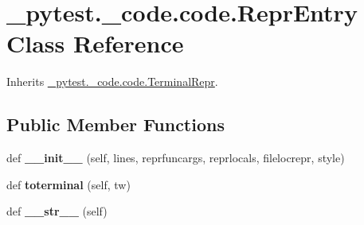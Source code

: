 \hypertarget{class__pytest_1_1__code_1_1code_1_1_repr_entry}{}\section{\+\_\+pytest.\+\_\+code.\+code.\+Repr\+Entry Class Reference}
\label{class__pytest_1_1__code_1_1code_1_1_repr_entry}


Inherits \hyperlink{class__pytest_1_1__code_1_1code_1_1_terminal_repr}{\+\_\+pytest.\+\_\+code.\+code.\+Terminal\+Repr}.

\subsection*{Public Member Functions}
\begin{DoxyCompactItemize}
\item 
\mbox{\label{class__pytest_1_1__code_1_1code_1_1_repr_entry_ad3a612d69ce94264315f5c7f21754887}} 
def {\bfseries \+\_\+\+\_\+init\+\_\+\+\_\+} (self, lines, reprfuncargs, reprlocals, filelocrepr, style)
\item 
\mbox{\label{class__pytest_1_1__code_1_1code_1_1_repr_entry_a9c973a70910a83827c488542f54b0545}} 
def {\bfseries toterminal} (self, tw)
\item 
\mbox{\label{class__pytest_1_1__code_1_1code_1_1_repr_entry_a1c2be5d0547ceeb69758e651a52d70d5}} 
def {\bfseries \+\_\+\+\_\+str\+\_\+\+\_\+} (self)
\end{DoxyCompactItemize}

